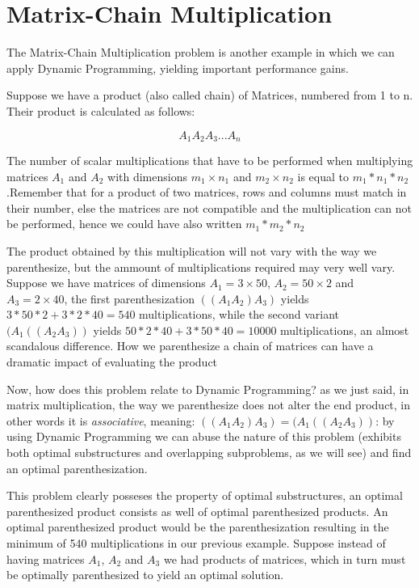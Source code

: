 \section{Matrix-Chain Multiplication}

The Matrix-Chain Multiplication problem is another example in which we can 
apply Dynamic Programming, yielding important performance gains.

Suppose we have a product (also called chain) of Matrices, numbered from 1 to n. Their product is
calculated as follows:

$$A_1A_2A_3...A_n$$

The number of scalar multiplications that have to be performed when multiplying matrices $A_1$
and $A_2$ with dimensions $m_1 \times n_1$ and $m_2\times n_2$ is equal to $m_1*n_1*n_2$ .Remember that
for a product of two matrices, rows and columns must match in their number, else the matrices are not 
compatible and the multiplication can not be performed, hence we could have also written $m_1*m_2*n_2$

The product obtained by this multiplication will not vary with the way we parenthesize,
but the ammount of multiplications required may very well vary. Suppose we have
matrices of dimensions $A_1 = 3 \times 50$, $A_2 = 50 \times 2$ and $A_3 = 2 \times 40$, 
the first parenthesization $((A_1A_2)A_3)$ yields $3*50*2 + 3*2*40 = 540$
multiplications, while the second variant $(A_1((A_2A_3))$ yields 
$50*2*40 + 3*50*40 = 10000$ multiplications, an almost scandalous difference.
How we parenthesize a chain of matrices can have a dramatic impact of evaluating
the product \cite{cormen2009introduction}

Now, how does this problem relate to Dynamic Programming? as we just said, in matrix 
multiplication, the way we parenthesize does not alter the end product, in other words it is
\emph{associative}, meaning:  $((A_1A_2)A_3) = (A_1((A_2A_3))$: by using Dynamic Programming
we can abuse the nature of this problem (exhibits both optimal substructures and
overlapping subproblems, as we will see) and find an optimal parenthesization.

This problem clearly posseses the property of optimal substructures, an optimal 
parenthesized product consists as well of optimal parenthesized products. An optimal
parenthesized product would be the parenthesization resulting in the minimum of 540
multiplications in our previous example. Suppose instead of having matrices $A_1$, 
$A_2$ and $A_3$ we had products of matrices, which in turn must be optimally parenthesized
to yield an optimal solution.

